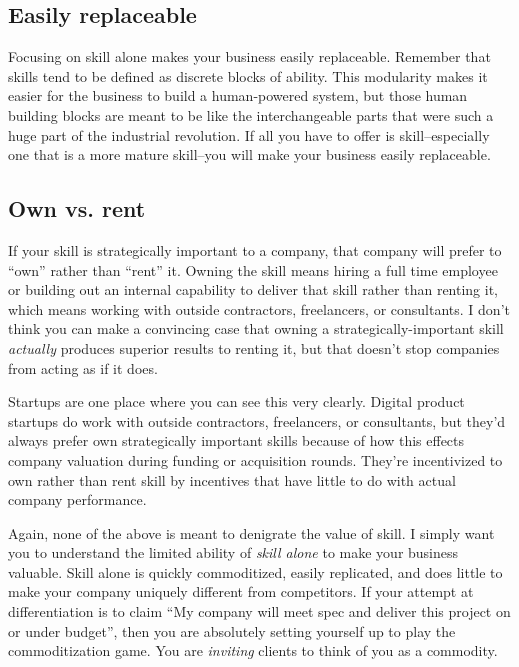\subsection{Easily replaceable}

Focusing on skill alone makes your business easily replaceable. Remember that skills tend to be defined as discrete blocks of ability. This modularity makes it easier for the business to build a human-powered system, but those human building blocks are meant to be like the interchangeable parts that were such a huge part of the industrial revolution. If all you have to offer is skill--especially one that is a more mature skill--you will make your business easily replaceable.

\subsection{Own vs. rent}

If your skill is strategically important to a company, that company will prefer to ``own'' rather than ``rent'' it. Owning the skill means hiring a full time employee or building out an internal capability to deliver that skill rather than renting it, which means working with outside contractors, freelancers, or consultants. I don't think you can make a convincing case that owning a strategically-important skill \emph{actually} produces superior results to renting it, but that doesn't stop companies from acting as if it does.

Startups are one place where you can see this very clearly. Digital product startups do work with outside contractors, freelancers, or consultants, but they'd always prefer own strategically important skills because of how this effects company valuation during funding or acquisition rounds. They're incentivized to own rather than rent skill by incentives that have little to do with actual company performance.

Again, none of the above is meant to denigrate the value of skill. I simply want you to understand the limited ability of \emph{skill alone} to make your business valuable. Skill alone is quickly commoditized, easily replicated, and does little to make your company uniquely different from competitors. If your attempt at differentiation is to claim ``My company will meet spec and deliver this project on or under budget'', then you are absolutely setting yourself up to play the commoditization game. You are \emph{inviting} clients to think of you as a commodity.

